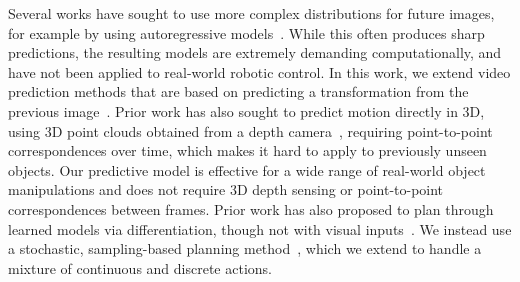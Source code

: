Several works have sought to use more complex distributions for future images, for example by using autoregressive models~\cite{video_pixel_networks,scott_reed}. While this often produces sharp predictions, the resulting models are extremely demanding computationally, and have not been applied to real-world robotic control. In this work, we extend video prediction methods that are based on predicting a transformation from the previous image~\cite{finn_nips,dynamic_filter_networks}. Prior work has also sought to predict motion directly in 3D, using 3D point clouds obtained from a depth camera~\cite{se3}, requiring point-to-point correspondences over time, which makes it hard to apply to previously unseen objects. Our predictive model is effective for a wide range of real-world object manipulations and does not require 3D depth sensing or point-to-point correspondences between frames.
Prior work has also proposed to plan through learned models via differentiation, though not with visual inputs~\cite{deep_mpc}. We instead use a stochastic, sampling-based planning method~\cite{cem-rk-13,foresight}, which we extend to handle a mixture of continuous and discrete actions.